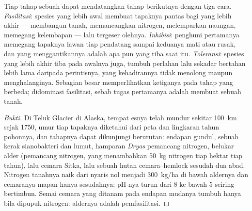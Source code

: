 \begin{proposition}\label{prop:b1:ecosystem-dynamics:mechanisms}
Tiap tahap sebuah  dapat mendatangkan tahap berikutnya dengan
tiga cara. \emph{Fasilitasi}: spesies yang lebih awal membuat tapaknya
pantas bagi yang lebih akhir --- membangun tanah, memancangkan
nitrogen, melemparkan naungan, memegang kelembapan --- lalu tergeser
olehnya. \emph{Inhibisi}: penghuni pertamanya memegang tapaknya lawan
tiap pendatang sampai keduanya mati atau rusak, dan yang
menggantikannya adalah apa pun yang tiba saat itu. \emph{Toleransi}:
spesies yang lebih akhir tiba pada awalnya juga, tumbuh perlahan lalu
sekadar bertahan lebih lama daripada perintisnya, yang kehadirannya
tidak menolong maupun menghalanginya. Sebagian besar 
memperlihatkan ketiganya pada tahap yang berbeda; 
didominasi fasilitasi, sebab tugas pertamanya adalah membuat sebuah
tanah.
\end{proposition}
\begin{proof}[Bukti]
Di Teluk Glacier di Alaska, tempat esnya telah mundur sekitar
\qty{100}{km} sejak 1750, umur tiap tapaknya diketahui dari peta dan
lingkaran tahun pohonnya, dan tahapnya dapat dikunjungi berurutan:
endapan gundul, sebuah kerak sianobakteri dan lumut, hamparan
\emph{Dryas} pemancang nitrogen, belukar alder (pemancang nitrogen,
yang menambahkan \qty{50}{kg} nitrogen tiap hektar tiap tahun), lalu
cemara Sitka, lalu sebuah hutan cemara--hemlock sesudah dua abad.
Nitrogen tanahnya naik dari nyaris nol menjadi \qty{300}{kg/ha} di
bawah aldernya dan cemaranya mapan hanya sesudahnya; pH-nya turun dari
8 ke bawah 5 seiring  bertimbun. Semai cemara yang ditanam
pada endapan mudanya tumbuh hanya bila dipupuk nitrogen: aldernya
adalah pemfasilitasi.
\end{proof}

